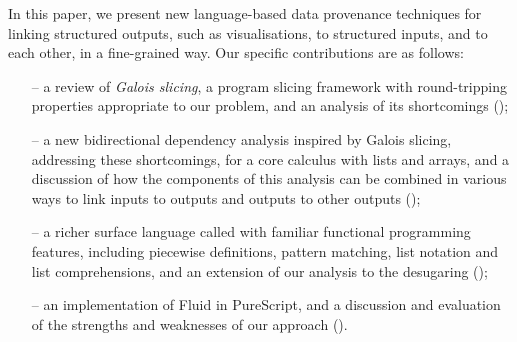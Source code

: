 In this paper, we present new language-based data provenance techniques for linking structured outputs, such as visualisations, to structured inputs, and to each other, in a fine-grained way. Our specific contributions are as follows:

\begin{itemize}[leftmargin=*]
   \item[--] a review of \emph{Galois slicing}, a program slicing framework with round-tripping properties appropriate to our problem, and an analysis of its shortcomings ();
   \item[--] a new bidirectional dependency analysis inspired by Galois slicing, addressing these shortcomings, for a core calculus with lists and arrays, and a discussion of how the components of this analysis can be combined in various ways to link inputs to outputs and outputs to other outputs ();
   \item[--] a richer surface language called \OurLanguage with familiar functional programming features, including piecewise definitions, pattern matching, list notation and list comprehensions, and an extension of our analysis to the desugaring ();
   \item[--] an implementation of Fluid in PureScript, and a discussion and evaluation of the strengths and weaknesses of our approach ().
\end{itemize}
